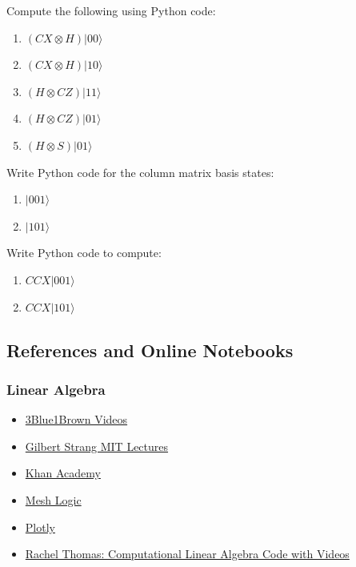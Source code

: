\documentclass[11pt]{article}
\providecommand{\tightlist}{%
      \setlength{\itemsep}{0pt}\setlength{\parskip}{0pt}}
\begin{document}
Compute the following using Python code:

\begin{enumerate}
\def\labelenumi{\arabic{enumi}.}
\setcounter{enumi}{10}
\tightlist
\item
  \((CX \otimes H)|00 \rangle\)
\item
  \((CX \otimes H)|10 \rangle\)
\item
  \((H \otimes CZ)|11 \rangle\)
\item
  \((H \otimes CZ)|01 \rangle\)
\item
  \((H \otimes S)|01 \rangle\)
\end{enumerate}

Write Python code for the column matrix basis states:

\begin{enumerate}
\def\labelenumi{\arabic{enumi}.}
\setcounter{enumi}{15}
\tightlist
\item
  \(|001 \rangle\)
\item
  \(|101 \rangle\)
\end{enumerate}

Write Python code to compute:

\begin{enumerate}
\def\labelenumi{\arabic{enumi}.}
\setcounter{enumi}{16}
\tightlist
\item
  \(CCX|001 \rangle\)
\item
  \(CCX|101 \rangle\)
\end{enumerate}

    \hypertarget{references-and-online-notebooks}{%
\subsection{References and Online
Notebooks}\label{references-and-online-notebooks}}

    \hypertarget{linear-algebra}{%
\subsubsection{Linear Algebra}\label{linear-algebra}}

\begin{itemize}
\item
  \href{https://www.youtube.com/watch?v=fNk_zzaMoSs\&list=PLZHQObOWTQDPD3MizzM2xVFitgF8hE_ab}{3Blue1Brown
  Videos}
\item
  \href{https://www.youtube.com/watch?v=7UJ4CFRGd-U\&list=PLE7DDD91010BC51F8}{Gilbert
  Strang MIT Lectures}
\item
  \href{https://www.youtube.com/watch?v=xyAuNHPsq-g\&list=PLFD0EB975BA0CC1E0}{Khan
  Academy}
\item
  \href{https://meshlogic.github.io/posts/jupyter/linear-algebra/linear-algebra-numpy-1/}{Mesh
  Logic}
\item
  \href{https://plot.ly/python/v3/linear-algebra/}{Plotly}
\item
  \href{https://github.com/fastai/numerical-linear-algebra}{Rachel
  Thomas: Computational Linear Algebra Code with Videos}
\end{itemize}
\end{document}
